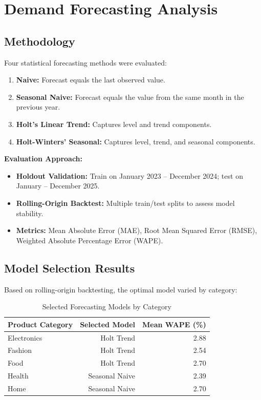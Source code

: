 \documentclass[11pt,a4paper]{article}
\begin{document}
\section{Demand Forecasting Analysis}

\subsection{Methodology}

Four statistical forecasting methods were evaluated:

\begin{enumerate}[leftmargin=1.5em]
    \item \textbf{Naive:} Forecast equals the last observed value.
    \item \textbf{Seasonal Naive:} Forecast equals the value from the same month in the previous year.
    \item \textbf{Holt's Linear Trend:} Captures level and trend components.
    \item \textbf{Holt-Winters' Seasonal:} Captures level, trend, and seasonal components.
\end{enumerate}

\textbf{Evaluation Approach:}
\begin{itemize}[leftmargin=1.5em]
    \item \textbf{Holdout Validation:} Train on January 2023 -- December 2024; test on January -- December 2025.
    \item \textbf{Rolling-Origin Backtest:} Multiple train/test splits to assess model stability.
    \item \textbf{Metrics:} Mean Absolute Error (MAE), Root Mean Squared Error (RMSE), Weighted Absolute Percentage Error (WAPE).
\end{itemize}

\subsection{Model Selection Results}

Based on rolling-origin backtesting, the optimal model varied by category:

\begin{table}[H]
\centering
\caption{Selected Forecasting Models by Category}
\label{tab:models}
\begin{tabular}{@{}lrr@{}}
\toprule
\textbf{Product Category} & \textbf{Selected Model} & \textbf{Mean WAPE (\%)} \\
\midrule
Electronics & Holt Trend & 2.88 \\
Fashion & Holt Trend & 2.54 \\
Food & Holt Trend & 2.70 \\
Health & Seasonal Naive & 2.39 \\
Home & Seasonal Naive & 2.70 \\
\bottomrule
\end{tabular}
\end{table}
\end{document}
